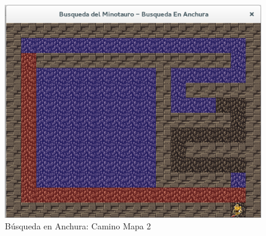 \documentclass[letter, titlepage, 10pt]{article}
\begin{document}
\begin{appendices}
\begin{figure}[H]
    \begin{center}
        \includegraphics[scale = 0.4]{images/bea_03_m2}
        \caption{Búsqueda en Anchura: Camino Mapa 2}
    \end{center}
\end{figure}



\end{appendices}
\end{document}
